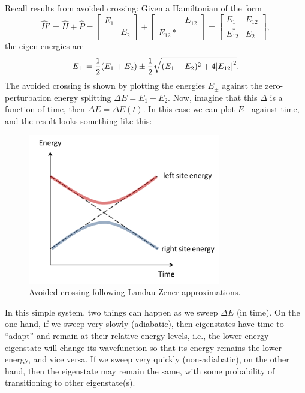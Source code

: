 \documentclass{book}
\theoremstyle{definition}
\newcommand{\f}[2]{\frac{#1}{#2}}
\begin{document}
Recall results from avoided crossing: Given a Hamiltonian of the form 
\begin{equation*}
\widehat{H}' = \widehat{H} + \widehat{P} = \begin{bmatrix}
E_1 & \\ & E_2
\end{bmatrix} + \begin{bmatrix}
& E_{12} \\ E_{12}* &
\end{bmatrix} = \begin{bmatrix}
E_1 & E_{12} \\ E_{12}^* & E_2
\end{bmatrix},
\end{equation*}
the eigen-energies are
\begin{equation*}
E_\pm = \f{1}{2}(E_1 + E_2) \pm  \f{1}{2}\sqrt{(E_1 - E_2)^2 + 4\abs{E_{12}}^2}.
\end{equation*}
The avoided crossing is shown by plotting the energies $E_\pm$ against the zero-perturbation energy splitting $\Delta E = E_1 - E_2$. Now, imagine that this $\Delta$ is a function of time, then $\Delta E = \Delta E(t)$. In this case we can plot $E_\pm$ against time, and the result looks something like this:

\begin{figure}[!htb]
	\centering
	\includegraphics[width=0.75\textwidth]{images/avoided-crossing.png}
	\caption{Avoided crossing following Landau-Zener approximations.}
	\label{fig:LZ}
\end{figure}

In this simple system, two things can happen as we sweep $\Delta E$ (in time).  On the one hand, if we sweep very slowly (adiabatic), then eigenstates have time to ``adapt'' and remain at their relative energy levels, i.e., the lower-energy eigenstate will change its wavefunction so that its energy remains the lower energy, and vice versa. If we sweep very quickly (non-adiabatic), on the other hand, then the eigenstate may remain the same, with some probability of transitioning to other eigenstate(s). \\
\end{document}
